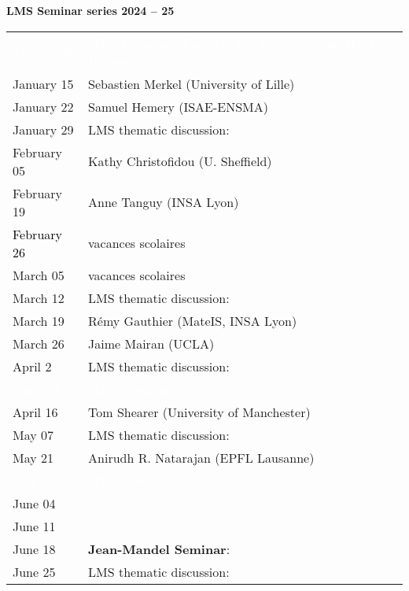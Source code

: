 \documentclass[a4paper,11pt,fleqn]{article}
\begin{document}
	\sffamily
	\thispagestyle{titlepage}
	\vspace*{-3em}
	\begin{center}
		\huge \textbf{LMS Seminar series 2024 -- 25}
	\end{center}
	\vspace*{-3em}
	\begin{center}
		\Large 
		\begin{tabular}{| p{3.5cm} p{14cm} |}
			\hline
			\rowcolor{docColor!99}
			\textcolor{white}{January 08} & \textcolor{white}{MECA seminar: Thao (Vicky) Nguyen (Johns Hopkins University)} \\
			January 15 & Sebastien Merkel (University of Lille) \\
			January 22 & Samuel Hemery (ISAE-ENSMA) \\
			\rowcolor{cyan}
			January 29 & LMS thematic discussion:~ \\
			February 05 & Kathy Christofidou (U. Sheffield)  \\
			February 19 & Anne Tanguy (INSA Lyon) \\
			\textcolor{black}{February 26} & {vacances scolaires} \\
			{March 05} & {vacances scolaires} \\
			\rowcolor{cyan}
			March 12 & LMS thematic discussion:~  \\
			\rowcolor{white}
			March 19 & R{\'e}my Gauthier (MateIS, INSA Lyon) \\
			March 26 & Jaime Mairan (UCLA)  \\
			\rowcolor{cyan}
			April 2 & LMS thematic discussion:~ \\
			\rowcolor{docColor!99}
			\textcolor{white}{April 09} & \textcolor{white}{MECA seminar: } \\
			April 16 & Tom Shearer (University of Manchester) \\
			\rowcolor{cyan}
			May 07 &  LMS thematic discussion:~ \\
			May 21 & Anirudh R. Natarajan (EPFL Lausanne) \\
			\rowcolor{docColor!99}
			\textcolor{white}{May 28} & \textcolor{white}{MECA seminar: } \\
			June 04 &  \\
			June 11 & \\
			June 18 &  \textbf{Jean-Mandel Seminar}:\\ 
			\rowcolor{cyan}
			June 25 & LMS thematic discussion:~\\
			\hline
		\end{tabular}
	\end{center}
	
\end{document}
